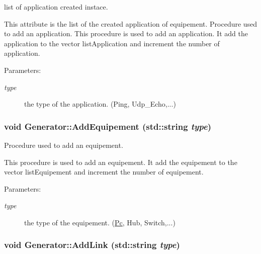 list of application created instace. 

This attribute is the list of the created application of equipement. Procedure used to add an application. This procedure is used to add an application. It add the application to the vector listApplication and increment the number of application.

\begin{Desc}
\item[Parameters:]
\begin{description}
\item[{\em type}]the type of the application. (Ping, Udp\_\-Echo,...) \end{description}
\end{Desc}
\hypertarget{class_generator_a8745946602d6e64e5b131d682737e77}{
\subsubsection[{AddEquipement}]{\setlength{\rightskip}{0pt plus 5cm}void Generator::AddEquipement (std::string {\em type})}}
\label{class_generator_a8745946602d6e64e5b131d682737e77}


Procedure used to add an equipement. 

This procedure is used to add an equipement. It add the equipement to the vector listEquipement and increment the number of equipement.

\begin{Desc}
\item[Parameters:]
\begin{description}
\item[{\em type}]the type of the equipement. (\hyperlink{class_pc}{Pc}, Hub, Switch,...) \end{description}
\end{Desc}
\hypertarget{class_generator_3fe9d83270bd9d22b9307d3b0a26ea39}{
\subsubsection[{AddLink}]{\setlength{\rightskip}{0pt plus 5cm}void Generator::AddLink (std::string {\em type})}}
\label{class_generator_3fe9d83270bd9d22b9307d3b0a26ea39}


